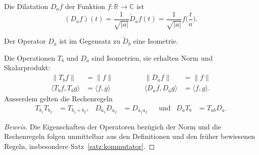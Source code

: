
\begin{definition}
Die Dilatation $D_af$ der Funktion $f\colon\mathbb R\to\mathbb C$ ist 
\[
(D_af)(t)
=
\frac{1}{\sqrt{|a|}} \tilde{D}_af(t)
=
\frac{1}{\sqrt{|a|}} f\biggl(\frac{t}{a}\biggr).
\]
\end{definition}
Der Operator $D_a$ ist im Gegensatz zu $\tilde{D}_b$ eine Isometrie.

\begin{satz}
\label{fourier:satz:TDisometrie}
Die Operationen $T_b$ und $D_a$ sind Isometrien, sie erhalten 
Norm und Skalarprodukt:
\begin{equation}
\begin{aligned}
\|T_bf\| &= \|f\|
&&\qquad&
\|D_af\| &= \|f\|
\\
\langle T_bf,T_bg\rangle &= \langle f,g\rangle
&&\qquad&
\langle D_af,D_ag\rangle &= \langle f,g\rangle.
\end{aligned}
\label{fourier:satz:formel:isometrie}
\end{equation}
Ausserdem gelten die Rechenregeln
\begin{align*}
T_{b_1}T_{b_2}&=T_{b_1+b_2},
&
D_{a_1} D_{a_2}&=D_{a_1a_2}
&&\text{und}&
D_aT_b
&=
T_{ab}D_a.
\end{align*}
\end{satz}

\begin{proof}[Beweis]
Die Eigenschaften der Operatoren bezügich der Norm und die Rechenregeln
folgen unmittelbar aus den Definitionen und
den früher bewiesenen Regeln, insbesondere Satz~\ref{satz:kommutator}.
\end{proof}

